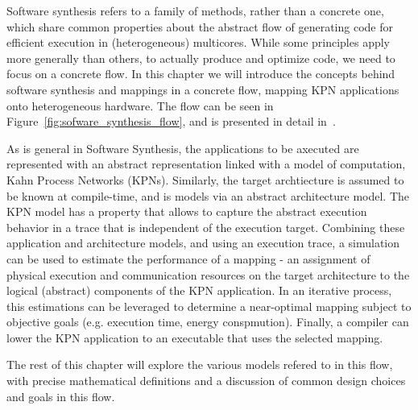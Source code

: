 %

Software synthesis refers to a family of methods, rather than a concrete one, which share common properties about the abstract flow of generating code for efficient execution in (heterogeneous) multicores.
While some principles apply more generally than others, to actually produce and optimize code, we need to focus on a concrete flow.
In this chapter we will introduce the concepts behind software synthesis and mappings in a concrete flow, mapping KPN applications onto heterogeneous hardware.
The flow can be seen in Figure~\ref{fig:sofware_synthesis_flow}, and is presented in detail in~\cite{castrillon2014thesis}. 


As is general in Software Synthesis, the applications to be axecuted are represented with an abstract representation linked with a model of computation, Kahn Process Networks (KPNs). Similarly, the target archtiecture is assumed to be known at compile-time, and is models via an abstract architecture model. The KPN model has a property that allows to capture the abstract execution behavior in a trace that is independent of the execution target. Combining these application and architecture models, and using an execution trace, a simulation can be used to estimate the performance of a mapping - an assignment of physical execution and communication resources on the target architecture to the logical (abstract) components of the KPN application. In an iterative process, this estimations can be leveraged to determine a near-optimal mapping subject to objective goals (e.g. execution time, energy conspmution). Finally, a compiler can lower the KPN application to an executable that uses the selected mapping.

The rest of this chapter will explore the various models refered to in this flow, with precise mathematical definitions and a discussion of common design choices and goals in this flow.

